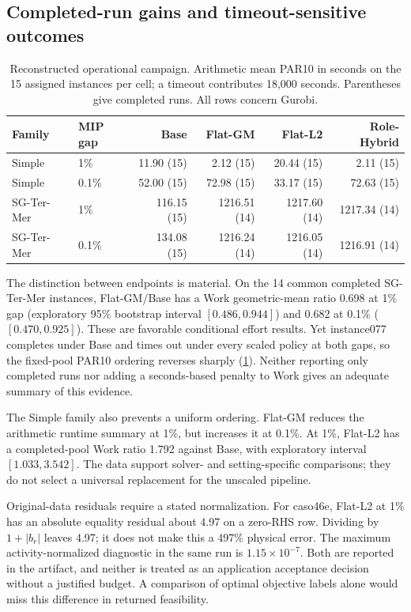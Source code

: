 \documentclass[11pt]{article}
\theoremstyle{definition}
\theoremstyle{remark}
\begin{document}
\subsection{Completed-run gains and timeout-sensitive outcomes}
\begin{table}[tb]
\centering\small
\caption{Reconstructed operational campaign. Arithmetic mean PAR10 in seconds on the
15 assigned instances per cell; a timeout contributes 18,000 seconds. Parentheses give
completed runs. All rows concern Gurobi.}\label{tab:operational}
\begin{tabular}{llrrrr}
\toprule
Family & MIP gap & Base & Flat-GM & Flat-L2 & Role-Hybrid\\
\midrule
Simple & 1\% & 11.90 (15) & 2.12 (15) & 20.44 (15) & 2.11 (15)\\
Simple & 0.1\% & 52.00 (15) & 72.98 (15) & 33.17 (15) & 72.63 (15)\\
SG-Ter-Mer & 1\% & 116.15 (15) & 1216.51 (14) & 1217.60 (14) & 1217.34 (14)\\
SG-Ter-Mer & 0.1\% & 134.08 (15) & 1216.24 (14) & 1216.05 (14) & 1216.91 (14)\\
\bottomrule
\end{tabular}
\end{table}
The distinction between endpoints is material. On the 14 common completed SG-Ter-Mer
instances, Flat-GM/Base has a Work geometric-mean ratio 0.698 at 1\% gap
(exploratory 95\% bootstrap interval $[0.486,0.944]$) and 0.682 at 0.1\%
($[0.470,0.925]$). These are favorable conditional effort results. Yet instance077
completes under Base and times out under every scaled policy at both gaps, so the
fixed-pool PAR10 ordering reverses sharply (\cref{tab:operational}). Neither reporting
only completed runs nor adding a seconds-based penalty to Work gives an adequate
summary of this evidence.

The Simple family also prevents a uniform ordering. Flat-GM reduces the arithmetic
runtime summary at 1\%, but increases it at 0.1\%. At 1\%, Flat-L2 has a completed-pool
Work ratio 1.792 against Base, with exploratory interval $[1.033,3.542]$.
The data support solver- and setting-specific comparisons; they do not select a
universal replacement for the unscaled pipeline.

Original-data residuals require a stated normalization. For caso46e, Flat-L2 at 1\%
has an absolute equality residual about 4.97 on a zero-RHS row. Dividing by
$1+|b_r|$ leaves 4.97; it does not make this a 497\% physical error. The maximum
activity-normalized diagnostic in the same run is $1.15\times10^{-7}$. Both are
reported in the artifact, and neither is treated as an application acceptance decision
without a justified budget. A comparison of optimal objective labels alone would
miss this difference in returned feasibility.
\end{document}
